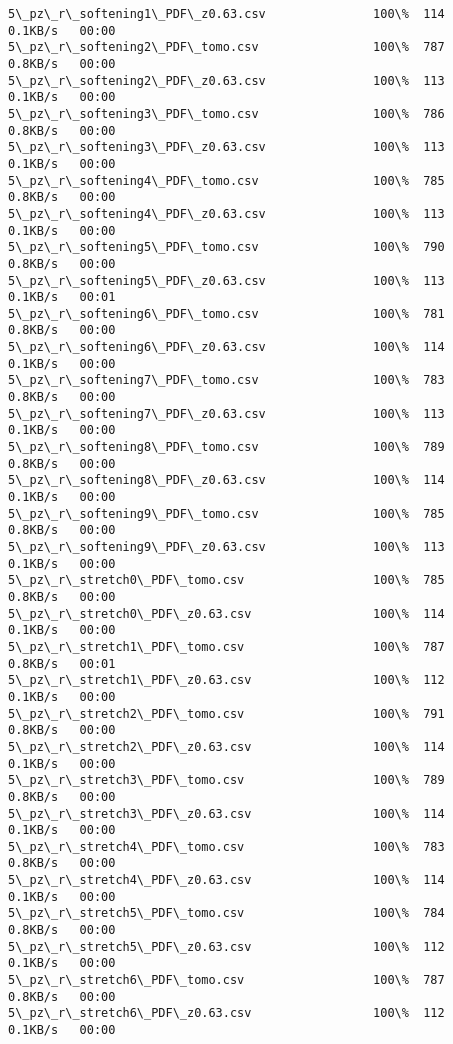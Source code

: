 \documentclass[11pt]{article}
\begin{document}
\begin{Verbatim}[commandchars=\\\{\}]
5\_pz\_r\_softening1\_PDF\_z0.63.csv               100\%  114     0.1KB/s   00:00    
5\_pz\_r\_softening2\_PDF\_tomo.csv                100\%  787     0.8KB/s   00:00    
5\_pz\_r\_softening2\_PDF\_z0.63.csv               100\%  113     0.1KB/s   00:00    
5\_pz\_r\_softening3\_PDF\_tomo.csv                100\%  786     0.8KB/s   00:00    
5\_pz\_r\_softening3\_PDF\_z0.63.csv               100\%  113     0.1KB/s   00:00    
5\_pz\_r\_softening4\_PDF\_tomo.csv                100\%  785     0.8KB/s   00:00    
5\_pz\_r\_softening4\_PDF\_z0.63.csv               100\%  113     0.1KB/s   00:00    
5\_pz\_r\_softening5\_PDF\_tomo.csv                100\%  790     0.8KB/s   00:00    
5\_pz\_r\_softening5\_PDF\_z0.63.csv               100\%  113     0.1KB/s   00:01    
5\_pz\_r\_softening6\_PDF\_tomo.csv                100\%  781     0.8KB/s   00:00    
5\_pz\_r\_softening6\_PDF\_z0.63.csv               100\%  114     0.1KB/s   00:00    
5\_pz\_r\_softening7\_PDF\_tomo.csv                100\%  783     0.8KB/s   00:00    
5\_pz\_r\_softening7\_PDF\_z0.63.csv               100\%  113     0.1KB/s   00:00    
5\_pz\_r\_softening8\_PDF\_tomo.csv                100\%  789     0.8KB/s   00:00    
5\_pz\_r\_softening8\_PDF\_z0.63.csv               100\%  114     0.1KB/s   00:00    
5\_pz\_r\_softening9\_PDF\_tomo.csv                100\%  785     0.8KB/s   00:00    
5\_pz\_r\_softening9\_PDF\_z0.63.csv               100\%  113     0.1KB/s   00:00    
5\_pz\_r\_stretch0\_PDF\_tomo.csv                  100\%  785     0.8KB/s   00:00    
5\_pz\_r\_stretch0\_PDF\_z0.63.csv                 100\%  114     0.1KB/s   00:00    
5\_pz\_r\_stretch1\_PDF\_tomo.csv                  100\%  787     0.8KB/s   00:01    
5\_pz\_r\_stretch1\_PDF\_z0.63.csv                 100\%  112     0.1KB/s   00:00    
5\_pz\_r\_stretch2\_PDF\_tomo.csv                  100\%  791     0.8KB/s   00:00    
5\_pz\_r\_stretch2\_PDF\_z0.63.csv                 100\%  114     0.1KB/s   00:00    
5\_pz\_r\_stretch3\_PDF\_tomo.csv                  100\%  789     0.8KB/s   00:00    
5\_pz\_r\_stretch3\_PDF\_z0.63.csv                 100\%  114     0.1KB/s   00:00    
5\_pz\_r\_stretch4\_PDF\_tomo.csv                  100\%  783     0.8KB/s   00:00    
5\_pz\_r\_stretch4\_PDF\_z0.63.csv                 100\%  114     0.1KB/s   00:00    
5\_pz\_r\_stretch5\_PDF\_tomo.csv                  100\%  784     0.8KB/s   00:00    
5\_pz\_r\_stretch5\_PDF\_z0.63.csv                 100\%  112     0.1KB/s   00:00    
5\_pz\_r\_stretch6\_PDF\_tomo.csv                  100\%  787     0.8KB/s   00:00    
5\_pz\_r\_stretch6\_PDF\_z0.63.csv                 100\%  112     0.1KB/s   00:00    

\end{Verbatim}
\end{document}
